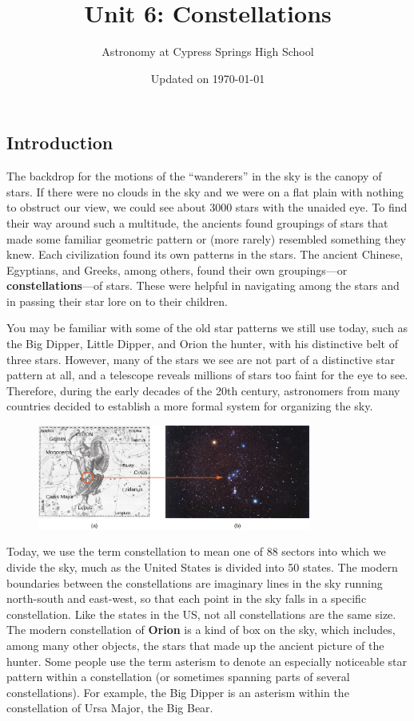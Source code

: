 \documentclass{article}
\title{Unit 6: Constellations}
\author{Astronomy at Cypress Springs High School}
\date{Updated on \today}
\numberwithin{equation}{section}
\numberwithin{figure}{section}
\begin{document}
\maketitle

\subsection{Introduction}

The backdrop for the motions of the ``wanderers'' in the sky is the canopy of stars. If there were no clouds in the sky and we were on a flat plain with nothing to obstruct our view, we could see about 3000 stars with the unaided eye. To find their way around such a multitude, the ancients found groupings of stars that made some familiar geometric pattern or (more rarely) resembled something they knew. Each civilization found its own patterns in the stars. The ancient Chinese, Egyptians, and Greeks, among others, found their own groupings---or \textbf{constellations}---of stars. These were helpful in navigating among the stars and in passing their star lore on to their children.

\vspace{1ex}

You may be familiar with some of the old star patterns we still use today, such as the Big Dipper, Little Dipper, and Orion the hunter, with his distinctive belt of three stars. However, many of the stars we see are not part of a distinctive star pattern at all, and a telescope reveals millions of stars too faint for the eye to see. Therefore, during the early decades of the 20th century, astronomers from many countries decided to establish a more formal system for organizing the sky.

\begin{figure}[h!]
    \centering
    \includegraphics[width=0.8\textwidth]{Figures/Figure2.8.jpg}
\end{figure}

Today, we use the term constellation to mean one of 88 sectors into which we divide the sky, much as the United States is divided into 50 states. The modern boundaries between the constellations are imaginary lines in the sky running north-south and east-west, so that each point in the sky falls in a specific constellation. Like the states in the US, not all constellations are the same size. The modern constellation of \textbf{Orion} is a kind of box on the sky, which includes, among many other objects, the stars that made up the ancient picture of the hunter. Some people use the term asterism to denote an especially noticeable star pattern within a constellation (or sometimes spanning parts of several constellations). For example, the Big Dipper is an asterism within the constellation of Ursa Major, the Big Bear.
\end{document}
